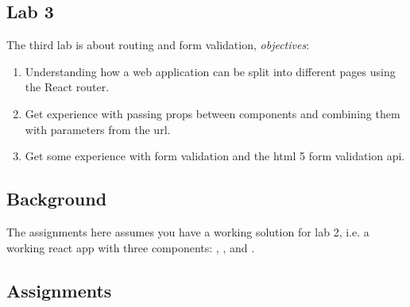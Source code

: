 \documentclass[fleqn, article, a4paper]{memoir}
\begin{document}
\maketitle
\thispagestyle{titlepage}
\vspace{-4cm}

\subsection*{Lab 3}

\n The third lab is about routing and form validation, \emph{objectives}:

\begin{enumerate}\firmlist
\item Understanding how a web application can be split into different pages using the React router.
\item Get experience with passing props between components and combining them with parameters from the url.
\item Get some experience with form validation and the html 5 form validation api.
\end{enumerate}

\subsection*{Background}

The assignments here assumes you have a working solution for lab 2, i.e. a working react app with three components: , , and .

\subsection*{Assignments}
\end{document}
